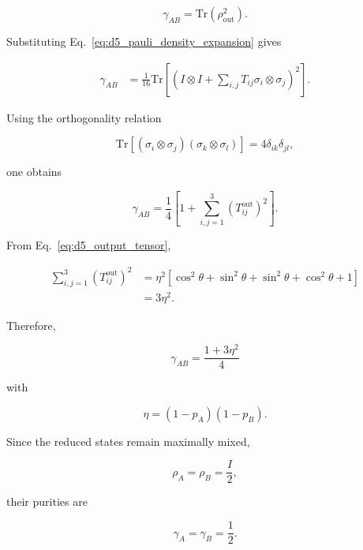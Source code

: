 \begin{equation}
\gamma_{AB}
=
\mathrm{Tr}
\left(
\rho_{\mathrm{out}}^{2}
\right).
\end{equation}

Substituting Eq.~\eqref{eq:d5_pauli_density_expansion} gives

\begin{align}
\gamma_{AB}
&=
\frac{1}{16}
\mathrm{Tr}
\left[
\left(
I\otimes I
+
\sum_{i,j}T_{ij}\sigma_i\otimes\sigma_j
\right)^2
\right].
\end{align}

Using the orthogonality relation

\begin{equation}
\mathrm{Tr}
\left[
(\sigma_i\otimes\sigma_j)
(\sigma_k\otimes\sigma_l)
\right]
=
4
\delta_{ik}
\delta_{jl},
\label{eq:d5_pauli_orthogonality}
\end{equation}

one obtains

\begin{equation}
\gamma_{AB}
=
\frac14
\left[
1
+
\sum_{i,j=1}^{3}
(T_{ij}^{\mathrm{out}})^2
\right].
\label{eq:d5_purity_tensor_formula}
\end{equation}

\medskip

From Eq.~\eqref{eq:d5_output_tensor},

\begin{align}
\sum_{i,j=1}^{3}
(T_{ij}^{\mathrm{out}})^2
&=
\eta^2
\left[
\cos^2\theta
+
\sin^2\theta
+
\sin^2\theta
+
\cos^2\theta
+
1
\right]
\nonumber
\\
&=
3\eta^2.
\end{align}

Therefore,

\begin{equation}
\boxed{
\gamma_{AB}
=
\frac{1+3\eta^2}{4}
}
\label{eq:d5_final_purity}
\end{equation}

with

\[
\eta=(1-p_A)(1-p_B).
\]

\medskip

Since the reduced states remain maximally mixed,

\begin{equation}
\rho_A
=
\rho_B
=
\frac{I}{2},
\end{equation}

their purities are

\begin{equation}
\boxed{
\gamma_A
=
\gamma_B
=
\frac12
}.
\end{equation}

